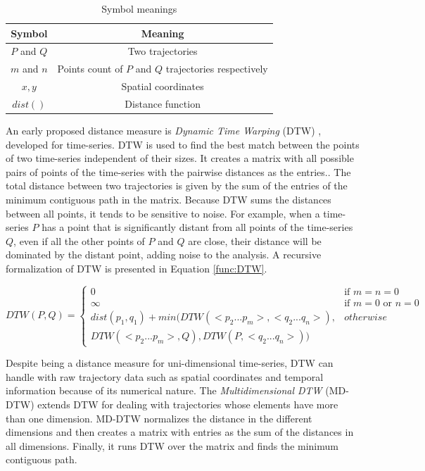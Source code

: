\documentclass[12pt]{article}
\begin{document}
\begin{table}[!h]
    \centering
    \begin{tabular}{c|c}
         Symbol & Meaning  \\
         \hline
         $P$ and $Q$ & Two trajectories \\
         $m$ and $n$ & Points count of $P$ and $Q$ trajectories respectively \\
         $x,y$ & Spatial coordinates \\
         $dist()$ & Distance function
    \end{tabular}
    \caption{Symbol meanings}
    \label{tab:symbols}
\end{table}

An early proposed distance measure is \emph{Dynamic Time Warping} (DTW) \cite{berndt1994using}, developed for time-series. DTW is used to find the best match between the points of two time-series independent of their sizes. It creates a matrix with all possible pairs of points of the time-series with the pairwise distances as the entries.. %
The total distance between two trajectories is given by the sum of the entries of the minimum contiguous path in the matrix. Because DTW sums the distances between all points, it tends to be sensitive to noise. For example, when a time-series $P$ has a point that is significantly distant from all points of the time-series $Q$, even if all the other points of $P$ and $Q$ are close, their distance will be dominated by the distant point, adding noise to the analysis. A recursive formalization of DTW is presented in Equation \ref{func:DTW}.


\begin{equation}
\label{func:DTW}
  DTW(P, Q) = 
  \begin{cases} 
      0 & \text{if } m = n = 0\\ 
      \infty & \text{if } m = 0 \text{ or } n = 0\\ 
      dist(p_1, q_1) + min(DTW(<p_2...p_m>,<q_2...q_n>), & otherwise\\
      DTW(<p_2...p_m>, Q), DTW(P, <q_2...q_n>)) &
  \end{cases}
\end{equation}

Despite being a distance measure for uni-dimensional time-series, DTW can handle with raw trajectory data such as spatial coordinates and temporal information because of its numerical nature. 
The \emph{Multidimensional DTW} (MD-DTW) \cite{ten2007multi} extends DTW for dealing with trajectories whose elements have more than one dimension. MD-DTW normalizes the distance in the different dimensions and then creates a matrix with entries as the sum of the distances in all dimensions. Finally, it runs DTW over the matrix and finds the minimum contiguous path.
\end{document}
